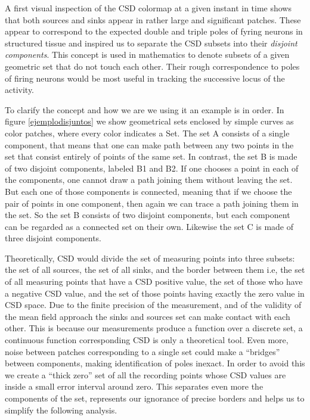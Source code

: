 \documentclass{article}
\begin{document}
A first visual inspection of the CSD colormap at a given instant in time shows that both sources and sinks appear in rather large and significant patches. These appear to correspond to the expected double and triple poles of fyring neurons in structured tissue \cite{} and inspired us to separate the CSD subsets into their \emph{disjoint components}. This concept is used in mathematics to denote subsets of a given geometric set that do not touch each other. Their rough correspondence to poles of firing neurons would be most useful in tracking the successive locus of the activity.


To clarify the concept and how we are we using it an example is in order. In figure \ref{ejemplodisjuntos} we show geometrical sets enclosed by simple curves as color patches, where every color indicates a Set. The set A consists of a single component, that means that one can make  path between any two points in the set that consist entirely of points of the same set. In contrast, the set B is made of two disjoint components, labeled B1 and B2. If one chooses a point in each of the components, one cannot draw a path joining them without leaving the set. But each one of those components is connected, meaning that if we choose the pair of points in one component, then again we can trace a path joining them in the set. So the set B consists of two disjoint components, but each component can be regarded as a connected set on their own. Likewise the set C is made of three disjoint components. 
 
Theoretically, CSD would divide the set of measuring points into three subsets: the set of all sources, the set of all sinks, and the border between them i.e, the set of all measuring points that have a CSD positive value, the set of those who have a negative CSD value, and the set of those points having exactly the zero value in CSD space.
Due to the finite precision of the measurement, and of the validity of the mean field approach the sinks and sources set can make contact with each other. This is because our measurements produce a function over a discrete set, a continuous function corresponding CSD is only a theoretical tool. 
Even more, noise between patches corresponding to a single set could make a ``bridges'' between components, making identification of poles inexact. In order to avoid this we create a ``thick zero'' set of all the recording points whose CSD values are inside a small error interval around zero. This separates even more the components of the set, represents our ignorance of precise borders and helps us to simplify the following analysis. 
 
\end{document}
